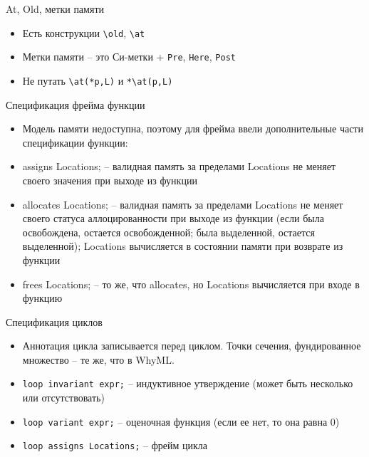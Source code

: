 \documentclass[hyperref={unicode=true}]{beamer}
\begin{document}
    \begin{frame}{At, Old, метки памяти}
    \begin{itemize}
    \item
    Есть конструкции \texttt{\textbackslash{}old}, \texttt{\textbackslash{}at}
    \item
    Метки памяти -- это Си-метки + \texttt{Pre}, \texttt{Here}, \texttt{Post}
    \item
    Не путать \texttt{\textbackslash{}at(*p,L)} и \texttt{*\textbackslash{}at(p,L)}
    \end{itemize}
    \end{frame}

    \begin{frame}{Спецификация фрейма функции}
    \begin{itemize}
    \item
    Модель памяти недоступна, поэтому для фрейма ввели
    дополнительные части спецификации функции:
    \item
    assigns Locations; -- валидная память за пределами Locations
    не меняет своего значения при выходе из функции
    \item
    allocates Locations; -- валидная память за пределами Locations
    не меняет своего статуса аллоцированности при выходе из функции
    (если была освобождена, остается освобожденной; была выделенной,
     остается выделенной); Locations вычисляется в состоянии памяти
    при возврате из функции
    \item
    frees Locations; -- то же, что allocates, но Locations
    вычисляется при входе в функцию
    \end{itemize}
    \end{frame}

    \begin{frame}{Спецификация циклов}
    \begin{itemize}
    \item
    Аннотация цикла записывается перед циклом. Точки сечения,
    фундированное множество -- те же, что в WhyML.
    \item
    \texttt{loop invariant expr;} -- индуктивное утверждение
    (может быть несколько или отсутствовать)
    \item
    \texttt{loop variant expr;} -- оценочная функция
    (если ее нет, то она равна 0)
    \item
    \texttt{loop assigns Locations;} -- фрейм цикла
    \end{itemize}
    \end{frame}
\end{document}
